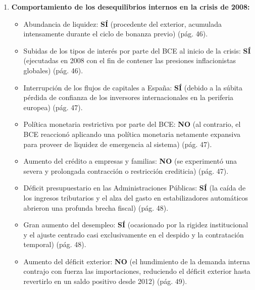 \begin{enumerate}[label=\arabic*.]
    \item \textbf{Comportamiento de los desequilibrios internos en la crisis de 2008:}
    \begin{itemize}
        \item Abundancia de liquidez: \textbf{SÍ} (procedente del exterior, acumulada intensamente durante el ciclo de bonanza previo) (pág. 46).
        \item Subidas de los tipos de interés por parte del BCE al inicio de la crisis: \textbf{SÍ} (ejecutadas en 2008 con el fin de contener las presiones inflacionistas globales) (pág. 46).
        \item Interrupción de los flujos de capitales a España: \textbf{SÍ} (debido a la súbita pérdida de confianza de los inversores internacionales en la periferia europea) (pág. 47).
        \item Política monetaria restrictiva por parte del BCE: \textbf{NO} (al contrario, el BCE reaccionó aplicando una política monetaria netamente expansiva para proveer de liquidez de emergencia al sistema) (pág. 47).
        \item Aumento del crédito a empresas y familias: \textbf{NO} (se experimentó una severa y prolongada contracción o restricción crediticia) (pág. 47).
        \item Déficit presupuestario en las Administraciones Públicas: \textbf{SÍ} (la caída de los ingresos tributarios y el alza del gasto en estabilizadores automáticos abrieron una profunda brecha fiscal) (pág. 48).
        \item Gran aumento del desempleo: \textbf{SÍ} (ocasionado por la rigidez institucional y el ajuste centrado casi exclusivamente en el despido y la contratación temporal) (pág. 48).
        \item Aumento del déficit exterior: \textbf{NO} (el hundimiento de la demanda interna contrajo con fuerza las importaciones, reduciendo el déficit exterior hasta revertirlo en un saldo positivo desde 2012) (pág. 49).
    \end{itemize}


\end{enumerate}
